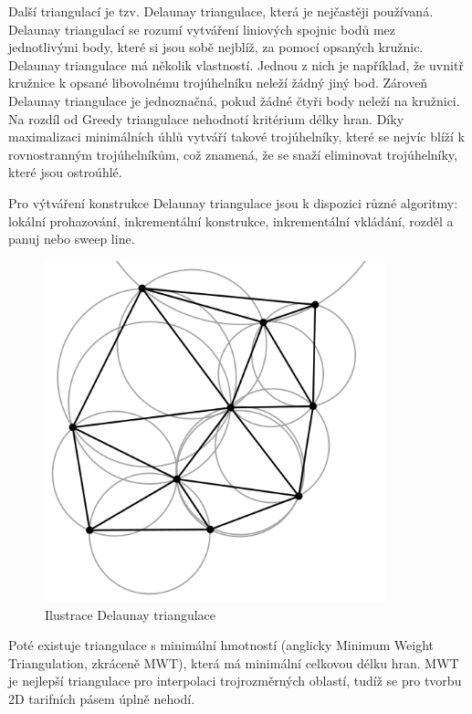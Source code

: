 Další triangulací je tzv. Delaunay triangulace, která je nejčastěji používaná.
Delaunay triangulací se rozumí vytváření liniových spojnic bodů mez jednotlivými body, které si jsou sobě nejblíž,
za pomocí opsaných kružnic. Delaunay triangulace má několik vlastností. Jednou z nich je například,
že uvnitř kružnice k opsané libovolnému trojúhelníku neleží žádný jiný bod.
Zároveň Delaunay triangulace je jednoznačná, pokud žádné čtyři body neleží na kružnici.
Na rozdíl od Greedy triangulace nehodnotí kritérium délky hran. Díky maximalizaci minimálních
úhlů vytváří takové trojúhelníky, které se nejvíc blíží k rovnostranným trojúhelníkům, 
což znamená, že se snaží eliminovat trojúhelníky, které jsou ostroúhlé.

Pro výtváření konstrukce Delaunay triangulace jsou k dispozici různé algoritmy: lokální prohazování, 
inkrementální konstrukce, inkrementální vkládání, rozděl a panuj nebo sweep line. \cite{bayer-delaunay}

\begin{figure}[H] \centering
    \includegraphics[width=280pt]{./pictures/triangulace-delaunay.png}
    \caption[Ilustrace Delaunay triangulace]{Ilustrace Delaunay triangulace \cite{triangulace-delaunay}}
	\label{fig:triangulace-delaunay}              
\end{figure}

Poté existuje triangulace s minimální hmotností (anglicky Minimum Weight Triangulation, zkráceně MWT),
která má minimální celkovou délku hran. MWT je nejlepší triangulace pro interpolaci trojrozměrných oblastí,
tudíž se pro tvorbu 2D tarifních pásem úplně nehodí.

